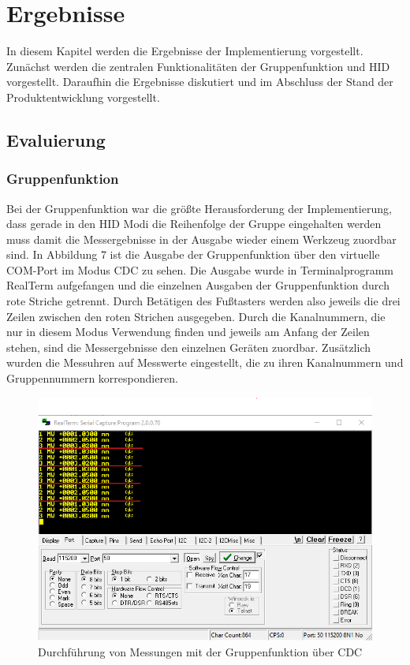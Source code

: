 \section{Ergebnisse}
\label{Ergebnisse}
In diesem Kapitel werden die Ergebnisse der Implementierung vorgestellt. Zunächst werden die zentralen Funktionalitäten der Gruppenfunktion und HID vorgestellt. Daraufhin die Ergebnisse diskutiert und im Abschluss der Stand der Produktentwicklung vorgestellt.

\subsection{Evaluierung}


\subsubsection{Gruppenfunktion}
Bei der Gruppenfunktion war die größte Herausforderung der Implementierung, dass gerade in den HID Modi die Reihenfolge der Gruppe eingehalten werden muss damit die Messergebnisse in der Ausgabe wieder einem Werkzeug zuordbar sind. In Abbildung 7 ist die Ausgabe der Gruppenfunktion über den virtuelle COM-Port im Modus CDC zu sehen. Die Ausgabe wurde in Terminalprogramm RealTerm aufgefangen und die einzelnen Ausgaben der Gruppenfunktion durch rote Striche getrennt. Durch Betätigen des Fußtasters werden also jeweils die drei Zeilen zwischen den roten Strichen ausgegeben. Durch die Kanalnummern, die nur in diesem Modus Verwendung finden und jeweils am Anfang der Zeilen stehen, sind die Messergebnisse den einzelnen Geräten zuordbar. Zusätzlich wurden die Messuhren auf Messwerte eingestellt, die zu ihren Kanalnummern und Gruppennummern korrespondieren. 
\begin{figure}[H] 
	\centering
	\includegraphics[width=\textwidth]{figures/GroupFeature.png}
	\caption{Durchführung von Messungen mit der Gruppenfunktion über CDC}
\end{figure}

